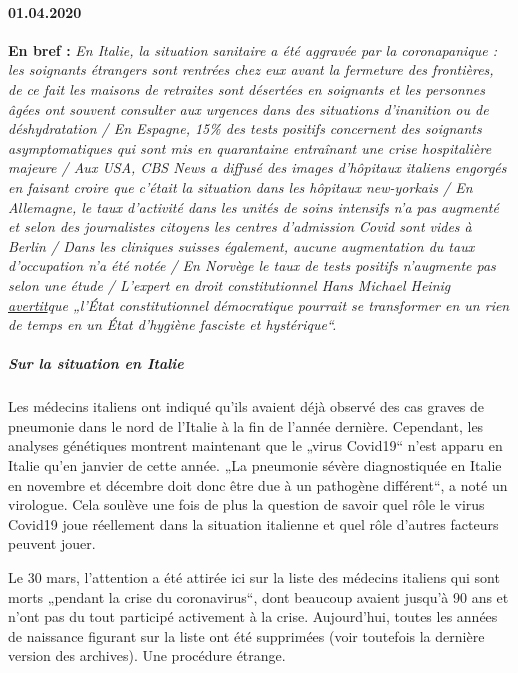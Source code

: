 \hypertarget{01042020}{%
\paragraph{01.04.2020}\label{01042020}}

\textbf{En bref :} \emph{En Italie, la situation sanitaire a été
aggravée par la coronapanique : les soignants étrangers sont rentrées
chez eux avant la fermeture des frontières, de ce fait les maisons de
retraites sont désertées en soignants et les personnes âgées ont souvent
consulter aux urgences dans des situations d'inanition ou de
déshydratation / En Espagne, 15\% des tests positifs concernent des
soignants asymptomatiques qui sont mis en quarantaine entraînant une
crise hospitalière majeure / Aux USA, CBS News a diffusé des images
d'hôpitaux italiens engorgés en faisant croire que c'était la situation
dans les hôpitaux new-yorkais / En Allemagne, le taux d'activité dans
les unités de soins intensifs n'a pas augmenté et selon des journalistes
citoyens les centres d'admission Covid sont vides à Berlin / Dans les
cliniques suisses également, aucune augmentation du taux d'occupation
n'a été notée / En Norvège le taux de tests positifs n'augmente pas
selon une étude / L'expert en droit constitutionnel Hans Michael Heinig
\href{https://www.focus.de/politik/deutschland/corona-regelungen-der-regierung-medizin-darf-nicht-gefaehrlicher-sein-als-die-krankheit_id_11827625.html}{avertit}que
„l'État constitutionnel démocratique pourrait se transformer en un rien
de temps en un État d'hygiène fasciste et hystérique``.}

\hypertarget{sur-la-situation-en-italie}{%
\subparagraph{\texorpdfstring{\textbf{Sur la situation en
Italie}}{Sur la situation en Italie}}\label{sur-la-situation-en-italie}}

Les médecins italiens ont indiqué qu'ils avaient déjà observé des cas
graves de pneumonie dans le nord de l'Italie à la fin de l'année
dernière. Cependant, les analyses génétiques montrent maintenant que le
„virus Covid19`` n'est apparu en Italie qu'en janvier de cette année.
„La pneumonie sévère diagnostiquée en Italie en novembre et décembre
doit donc être due à un pathogène différent``, a noté un virologue. Cela
soulève une fois de plus la question de savoir quel rôle le virus
Covid19 joue réellement dans la situation italienne et quel rôle
d'autres facteurs peuvent jouer.

Le 30 mars, l'attention a été attirée ici sur la liste des médecins
italiens qui sont morts „pendant la crise du coronavirus``, dont
beaucoup avaient jusqu'à 90 ans et n'ont pas du tout participé
activement à la crise. Aujourd'hui, toutes les années de naissance
figurant sur la liste ont été supprimées (voir toutefois la dernière
version des archives). Une procédure étrange.

